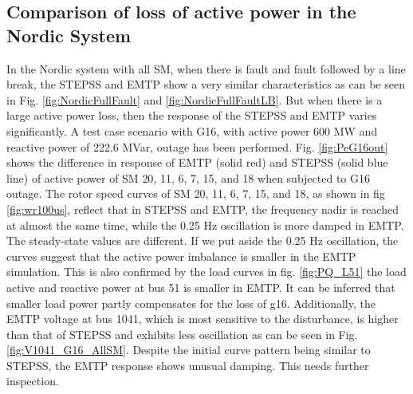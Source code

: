 \documentclass{report}
\begin{document}
\subsection{Comparison of loss of active power in the Nordic System}
In the Nordic system with all SM, when there is fault and fault followed by a line break, the STEPSS and EMTP show a very similar characteristics as can be seen in Fig. \ref{fig:NordicFullFault} and \ref{fig:NordicFullFaultLB}. But when there is a large active power loss, then the response of the STEPSS and EMTP varies significantly. A test case scenario with G16, with active power 600 MW and reactive power of 222.6 MVar, outage has been performed. Fig. \ref{fig:PeG16out} shows the difference in response of EMTP (solid red) and STEPSS (solid blue line) of active power of SM {20, 11, 6, 7, 15, and 18} when subjected to G16 outage. The rotor speed curves of SM {20, 11, 6, 7, 15, and 18}, as shown in fig \ref{fig:wr100us}, reflect that in STEPSS and EMTP, the frequency nadir is reached at almost the same time, while the 0.25 Hz oscillation is more damped in EMTP. The steady-state values are different. If we put aside the 0.25 Hz oscillation, the curves suggest that the active power imbalance is smaller in the EMTP simulation. This is also confirmed by the load curves in fig. \ref{fig:PQ_L51} the load active and reactive power at bus 51 is smaller in EMTP. It can be inferred that smaller load power partly compensates for the loss of g16. Additionally, the EMTP voltage at bus 1041, which is most sensitive to the disturbance, is higher than that of STEPSS and exhibits less oscillation as can be seen in Fig. \ref{fig:V1041_G16_AllSM}. Despite the initial curve pattern being similar to STEPSS, the EMTP response shows unusual damping. This needs further inspection. 
\end{document}

